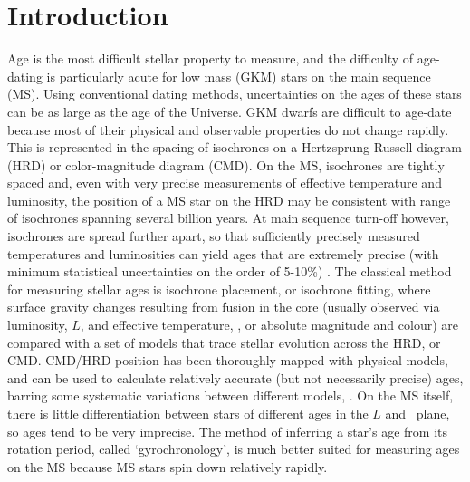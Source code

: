 \section{Introduction}
\label{section:intro}

Age is the most difficult stellar property to measure, and the difficulty of
age-dating is particularly acute for low mass (GKM) stars on the main sequence
(MS).
Using conventional dating methods, uncertainties on the ages of these stars
can be as large as the age of the Universe.
GKM dwarfs are difficult to age-date because most of their physical and
observable properties do not change rapidly.
This is represented in the spacing of isochrones on a Hertzsprung-Russell
diagram (HRD) or color-magnitude diagram (CMD).
On the MS, isochrones are tightly spaced and, even with very precise
measurements of effective temperature and luminosity, the position of a MS
star on the HRD may be consistent with range of isochrones spanning several
billion years.
At main sequence turn-off however, isochrones are spread further apart, so
that sufficiently precisely measured temperatures and luminosities can yield
ages that are extremely precise (with minimum statistical uncertainties on the
order of 5-10\%) \citep[\eg][]{pont2004}.
The classical method for measuring stellar ages is isochrone placement, or
isochrone fitting, where surface gravity changes resulting from fusion in the
core (usually observed via luminosity, $L$, and effective temperature, \teff,
or absolute magnitude and colour) are compared with a set of models that trace
stellar evolution across the HRD, or CMD.
CMD/HRD position has been thoroughly mapped with physical models, and can be
used to calculate relatively accurate (but not necessarily precise) ages,
barring some systematic variations between different models,
\citep[\eg][]{yi2001, dotter2008, dotter2016}.
On the MS itself, there is little differentiation between stars of different
ages in the $L$ and \teff\ plane, so ages tend to be very imprecise.
The method of inferring a star's age from its rotation period, called
`gyrochronology', is much better suited for measuring ages on the MS because
MS stars spin down relatively rapidly.


